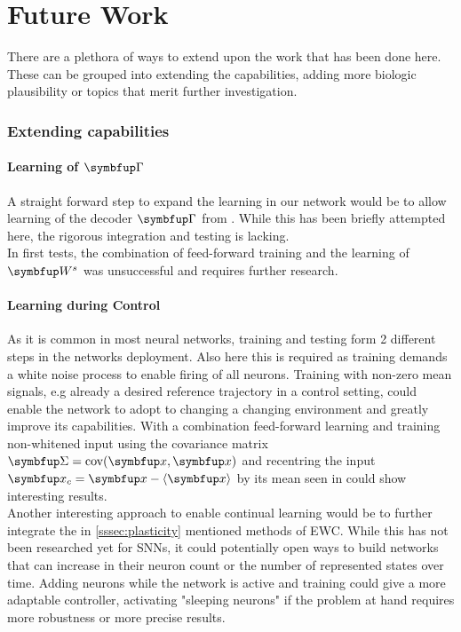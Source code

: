 \section{Future Work}
There are a plethora of ways to extend upon the work that has been done here. These can be grouped into extending the capabilities, adding more biologic plausibility or topics that merit further investigation.
\subsubsection{Extending capabilities}
\paragraph{Learning of $\bmu{\Gamma}$}
A straight forward step to expand the learning in our network would be to allow learning of the decoder $\bmu{\Gamma}$ from \cite{brendel_learning_2020}. While this has been briefly attempted here, the rigorous integration and testing is lacking.\\
In first tests, the combination of feed-forward training and the learning of $\bmu{W}^s$ was unsuccessful and requires further research.
\paragraph{Learning during Control}
As it is common in most neural networks, training and testing form 2 different steps in the networks deployment. Also here this is required as training demands a white noise process to enable firing of all neurons. Training with non-zero mean signals, e.g already a desired reference trajectory in a control setting, could enable the network to adopt to changing a changing environment and greatly improve its capabilities. With a combination feed-forward learning and training non-whitened input using the covariance matrix $\bmu{\Sigma} = \text{cov}(\bmu{x},\bmu{x})$ and recentring the input $\bmu{x
}_c = \bmu{x} - \langle \bmu{x}\rangle$ by its mean seen in \cite{vertechi_unsupervised_2014} could show interesting results.\\
Another interesting approach to enable continual learning would be to further integrate the in \cref{sssec:plasticity} mentioned methods of \ac{EWC}. While this has not been researched yet for \acp{SNN}, it could potentially open ways to build networks that can increase in their neuron count or the number of represented states over time. Adding neurons while the network is active and training could give a more adaptable controller, activating "sleeping neurons" if the problem at hand requires more robustness or more precise results.\\

